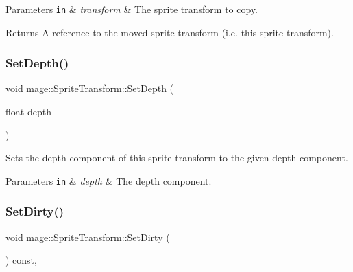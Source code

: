 \begin{DoxyParams}[1]{Parameters}
\mbox{\tt in}  & {\em transform} & The sprite transform to copy. \\
\hline
\end{DoxyParams}
\begin{DoxyReturn}{Returns}
A reference to the moved sprite transform (i.\+e. this sprite transform). 
\end{DoxyReturn}
\hypertarget{structmage_1_1_sprite_transform_af3aea2d2ea78a55bddaf6f73bcebff4f}{}\label{structmage_1_1_sprite_transform_af3aea2d2ea78a55bddaf6f73bcebff4f} 
\subsubsection{\texorpdfstring{Set\+Depth()}{SetDepth()}}
{\footnotesize\ttfamily void mage\+::\+Sprite\+Transform\+::\+Set\+Depth (\begin{DoxyParamCaption}\item[{float}]{depth }\end{DoxyParamCaption})\hspace{0.3cm}{\ttfamily [noexcept]}}

Sets the depth component of this sprite transform to the given depth component.


\begin{DoxyParams}[1]{Parameters}
\mbox{\tt in}  & {\em depth} & The depth component. \\
\hline
\end{DoxyParams}
\hypertarget{structmage_1_1_sprite_transform_ab76e0ca7d8f4e37a8a6f58a7a9face17}{}\label{structmage_1_1_sprite_transform_ab76e0ca7d8f4e37a8a6f58a7a9face17} 
\subsubsection{\texorpdfstring{Set\+Dirty()}{SetDirty()}}
{\footnotesize\ttfamily void mage\+::\+Sprite\+Transform\+::\+Set\+Dirty (\begin{DoxyParamCaption}{ }\end{DoxyParamCaption}) const\hspace{0.3cm}{\ttfamily [private]}, {\ttfamily [noexcept]}}

